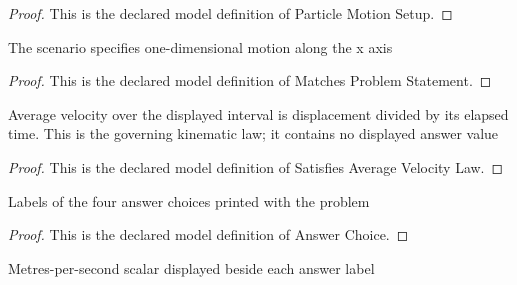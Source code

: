 \begin{proof}
  This is the declared model definition of Particle Motion Setup.
\end{proof}
\begin{definition}
  \label{def:physics:phyx-mini-0669:phyxminiproblems-problemphyxmini0669-matchesproblemstatement}
  The scenario specifies one-dimensional motion along the x axis
\end{definition}
\begin{proof}
  This is the declared model definition of Matches Problem Statement.
\end{proof}
\begin{definition}
  \label{def:physics:phyx-mini-0669:phyxminiproblems-problemphyxmini0669-satisfiesaveragevelocitylaw}
  Average velocity over the displayed interval is displacement divided by its elapsed time. This is the governing kinematic law; it contains no displayed answer value
\end{definition}
\begin{proof}
  This is the declared model definition of Satisfies Average Velocity Law.
\end{proof}
\begin{definition}
  \label{def:physics:phyx-mini-0669:phyxminiproblems-problemphyxmini0669-answerchoice}
  Labels of the four answer choices printed with the problem
\end{definition}
\begin{proof}
  This is the declared model definition of Answer Choice.
\end{proof}
\begin{definition}
  \label{def:physics:phyx-mini-0669:phyxminiproblems-problemphyxmini0669-answerchoice-meterspersecond}
  Metres-per-second scalar displayed beside each answer label
\end{definition}
